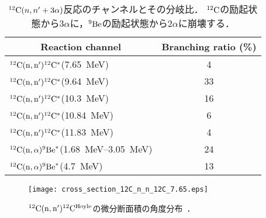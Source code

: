 \documentclass[../master]{subfiles}
\begin{document}
\begin{table}
  \centering
  \caption[${}^{12}{\rm C}(n,n'+3\alpha)$反応のチャンネルとその分岐比．]
          {${}^{12}{\rm C}(n,n'+3\alpha)$反応のチャンネルとその分岐比．
  ${}^{12}{\rm C}$の励起状態から$3\alpha$に，${}^{9}{\rm Be}$の励起状態から$2\alpha$に崩壊する．}
  \label{tab::branchingratio}
  \begin{tabular}{lc}
    \toprule
    \multicolumn{1}{c}{Reaction channel} & Branching ratio (\%)\\
    \midrule
    ${}^{12}{\rm C}({\rm n},{\rm n}'){}^{12}{\rm C}^{*}$(\SI{7.65}{\mega\electronvolt}) & 4\\
    ${}^{12}{\rm C}({\rm n},{\rm n}'){}^{12}{\rm C}^{*}$(\SI{9.64}{\mega\electronvolt}) & 33\\
    ${}^{12}{\rm C}({\rm n},{\rm n}'){}^{12}{\rm C}^{*}$(\SI{10.3}{\mega\electronvolt}) & 16\\
    ${}^{12}{\rm C}({\rm n},{\rm n}'){}^{12}{\rm C}^{*}$(\SI{10.84}{\mega\electronvolt}) & 6\\
    ${}^{12}{\rm C}({\rm n},{\rm n}'){}^{12}{\rm C}^{*}$(\SI{11.83}{\mega\electronvolt}) & 4\\
    ${}^{12}{\rm C}({\rm n},\alpha){}^{9}{\rm Be}^{*}$(\SIrange{1.68}{3.05}{\mega\electronvolt}) & 24\\
    ${}^{12}{\rm C}({\rm n},\alpha){}^{9}{\rm Be}^{*}$(\SI{4.7}{\mega\electronvolt}) & 13\\
    \bottomrule
  \end{tabular}
\end{table}

\begin{figure}
  \centering
  \texttt{[image: cross\_section\_12C\_n\_n\_12C\_7.65.eps]}
  \caption[${}^{12}{\rm C}({\rm n},{\rm n}'){}^{12}{\rm C}^{\rm Hoyle}$の微分断面積の角度分布．]
          {${}^{12}{\rm C}({\rm n},{\rm n}'){}^{12}{\rm C}^{\rm Hoyle}$の微分断面積の角度分布~\cite{kondoetal}．}
  \label{fig::sig_angle_dist}
\end{figure}
\end{document}
